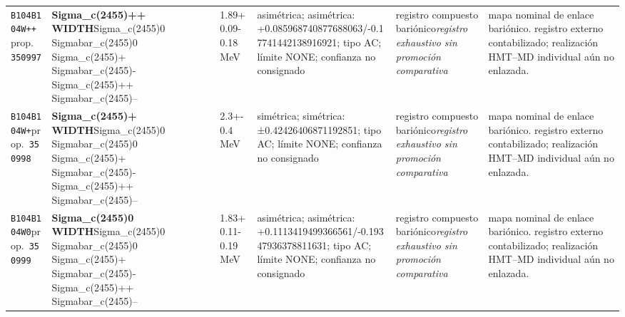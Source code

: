 \begin{landscape}
\begin{longtable}{L{1.85cm}L{4.45cm}L{2.35cm}L{4.05cm}L{3.35cm}L{7.15cm}}
\texttt{B104}\newline \texttt{B104W++}\newline prop.\ \texttt{350997} & \textbf{Sigma\_\allowbreak{}c(2455)++ WIDTH}\newline Sigma\_\allowbreak{}c(2455)0 \textbar{}\allowbreak{} Sigmabar\_\allowbreak{}c(2455)0 \textbar{}\allowbreak{} Sigma\_\allowbreak{}c(2455)+ \textbar{}\allowbreak{} Sigmabar\_\allowbreak{}c(2455)- \textbar{}\allowbreak{} Sigma\_\allowbreak{}c(2455)++ \textbar{}\allowbreak{} Sigmabar\_\allowbreak{}c(2455)-- & 1.89+0.09-0.18\,MeV & asimétrica; asimétrica: +0.085968740877688063/-0.17741442138916921; tipo AC; límite NONE; confianza no consignado & registro compuesto bariónico\newline \emph{registro exhaustivo sin promoción comparativa} & mapa nominal de enlace bariónico. registro externo contabilizado; realización HMT--MD individual aún no enlazada. \\
\texttt{B104}\newline \texttt{B104W+}\newline prop.\ \texttt{350998} & \textbf{Sigma\_\allowbreak{}c(2455)+ WIDTH}\newline Sigma\_\allowbreak{}c(2455)0 \textbar{}\allowbreak{} Sigmabar\_\allowbreak{}c(2455)0 \textbar{}\allowbreak{} Sigma\_\allowbreak{}c(2455)+ \textbar{}\allowbreak{} Sigmabar\_\allowbreak{}c(2455)- \textbar{}\allowbreak{} Sigma\_\allowbreak{}c(2455)++ \textbar{}\allowbreak{} Sigmabar\_\allowbreak{}c(2455)-- & 2.3+-0.4\,MeV & simétrica; simétrica: ±0.42426406871192851; tipo AC; límite NONE; confianza no consignado & registro compuesto bariónico\newline \emph{registro exhaustivo sin promoción comparativa} & mapa nominal de enlace bariónico. registro externo contabilizado; realización HMT--MD individual aún no enlazada. \\
\texttt{B104}\newline \texttt{B104W0}\newline prop.\ \texttt{350999} & \textbf{Sigma\_\allowbreak{}c(2455)0 WIDTH}\newline Sigma\_\allowbreak{}c(2455)0 \textbar{}\allowbreak{} Sigmabar\_\allowbreak{}c(2455)0 \textbar{}\allowbreak{} Sigma\_\allowbreak{}c(2455)+ \textbar{}\allowbreak{} Sigmabar\_\allowbreak{}c(2455)- \textbar{}\allowbreak{} Sigma\_\allowbreak{}c(2455)++ \textbar{}\allowbreak{} Sigmabar\_\allowbreak{}c(2455)-- & 1.83+0.11-0.19\,MeV & asimétrica; asimétrica: +0.1113419499366561/-0.19347936378811631; tipo AC; límite NONE; confianza no consignado & registro compuesto bariónico\newline \emph{registro exhaustivo sin promoción comparativa} & mapa nominal de enlace bariónico. registro externo contabilizado; realización HMT--MD individual aún no enlazada. \\

\end{longtable}
\end{landscape}
